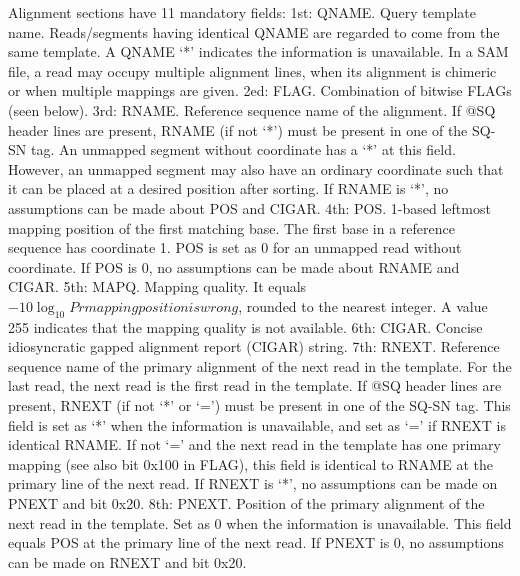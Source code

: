 \documentclass[11pt]{article}
\begin{document}
Alignment sections have 11 mandatory fields:
\newline
1st: QNAME. 
Query template name. 
Reads/segments having identical QNAME are regarded to come from the same template. 
A QNAME ‘*’ indicates the information is unavailable. 
In a SAM file, a read may occupy multiple alignment lines, when its alignment is chimeric or when multiple mappings are given.
\newline
2ed: FLAG. 
Combination of bitwise FLAGs (seen below).
\newline
3rd: RNAME. 
Reference sequence name of the alignment. 
If @SQ header lines are present, RNAME (if not ‘*’) must be present in one of the SQ-SN tag. 
An unmapped segment without coordinate has a ‘*’ at this field. 
However, an unmapped segment may also have an ordinary coordinate such that it can be placed at a desired position after sorting. 
If RNAME is ‘*’, no assumptions can be made about POS and CIGAR.
\newline
4th: POS. 
1-based leftmost mapping position of the first matching base. 
The first base in a reference sequence has coordinate 1. 
POS is set as 0 for an unmapped read without coordinate. 
If POS is 0, no assumptions can be made about RNAME and CIGAR.
\newline
5th: MAPQ. 
Mapping quality. 
It equals $−10 \log_{10} Pr{mapping position is wrong}$, rounded to the nearest integer. 
A value 255 indicates that the mapping quality is not available.
\newline
6th: CIGAR. 
Concise idiosyncratic gapped alignment report (CIGAR) string.
\newline
7th: RNEXT. 
Reference sequence name of the primary alignment of the next read in the template. 
For the last read, the next read is the first read in the template. 
If @SQ header lines are present, RNEXT (if not ‘*’ or ‘=’) must be present in one of the SQ-SN tag. 
This field is set as ‘*’ when the information is unavailable, and set as ‘=’ if RNEXT is identical RNAME. 
If not ‘=’ and the next read in the template has one primary mapping (see also bit 0x100 in FLAG), this field is identical to RNAME at the primary line of the next read. 
If RNEXT is ‘*’, no assumptions can be made on PNEXT and bit 0x20.
\newline
8th: PNEXT. 
Position of the primary alignment of the next read in the template. 
Set as 0 when the information is unavailable. 
This field equals POS at the primary line of the next read. 
If PNEXT is 0, no assumptions can be made on RNEXT and bit 0x20.
\newline
\end{document}
